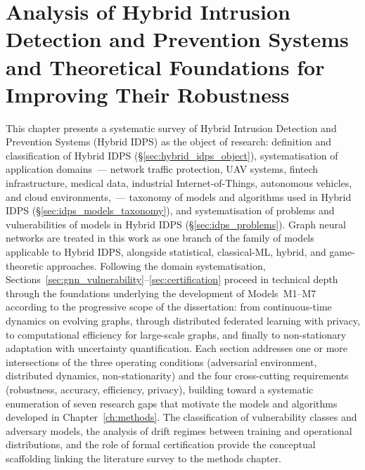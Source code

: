 
\chapter{Analysis of Hybrid Intrusion Detection and Prevention Systems and Theoretical Foundations for Improving Their Robustness}
\label{ch:literature}

This chapter presents a systematic survey of Hybrid Intrusion
Detection and Prevention Systems (Hybrid IDPS) as the object of
research: definition and classification of Hybrid IDPS
(\S\ref{sec:hybrid_idps_object}), systematisation of application
domains~--- network traffic protection, UAV systems, fintech
infrastructure, medical data, industrial Internet-of-Things,
autonomous vehicles, and cloud environments,~--- taxonomy of models
and algorithms used in Hybrid IDPS
(\S\ref{sec:idps_models_taxonomy}), and systematisation of problems
and vulnerabilities of models in Hybrid IDPS
(\S\ref{sec:idps_problems}). Graph neural networks are treated in
this work as one branch of the family of models applicable to
Hybrid IDPS, alongside statistical, classical-ML, hybrid, and
game-theoretic approaches. Following the domain systematisation,
Sections~\ref{sec:gnn_vulnerability}--\ref{sec:certification}
proceed in technical depth through the foundations underlying the
development of Models~M1--M7 according to the progressive scope
of the dissertation: from continuous-time dynamics on evolving
graphs, through distributed federated learning with privacy, to
computational efficiency for large-scale graphs, and finally to
non-stationary adaptation with uncertainty quantification. Each
section addresses one or more intersections of the three
operating conditions (adversarial environment, distributed
dynamics, non-stationarity) and the four cross-cutting
requirements (robustness, accuracy, efficiency, privacy),
building toward a systematic enumeration of seven research gaps
that motivate the models and algorithms developed in
Chapter~\ref{ch:methods}. The classification of vulnerability
classes and adversary models, the analysis of drift regimes
between training and operational distributions, and the role of
formal certification provide the conceptual scaffolding linking
the literature survey to the methods chapter.


